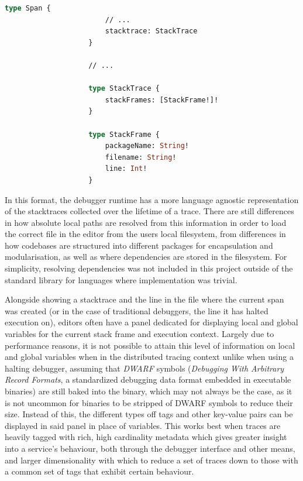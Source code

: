 \documentclass[12pt,pdftex,titlepage]{report}
\begin{document}
                \newpage
                \begin{lstlisting}[caption={GraphQL schema updated with stack- trace and frame objects, unchanged fields and objects filtered.}, language=GraphQL, gobble=20, label={lst:stack}]
                    type Span {
                        // ...
                        stacktrace: StackTrace
                    }

                    // ...

                    type StackTrace {
                        stackFrames: [StackFrame!]!
                    }

                    type StackFrame {
                        packageName: String!
                        filename: String!
                        line: Int!
                    }
                \end{lstlisting}

                In this format, the debugger runtime has a more language agnostic representation of the stacktraces collected over the lifetime of a trace. There are still differences
                in how absolute local paths are resolved from this information in order to load the correct file in the editor from the users local filesystem, from differences in how
                codebases are structured into different packages for encapsulation and modularisation, as well as where dependencies are stored in the filesystem. For simplicity, 
                resolving dependencies was not included in this project outside of the standard library for languages where implementation was trivial.

                Alongside showing a stacktrace and the line in the file where the current span was created (or in the case of traditional debuggers, the line it has halted execution on),
                editors often have a panel dedicated for displaying local and global variables for the current stack frame and execution context. Largely due to performance reasons, it is
                not possible to attain this level of information on local and global variables when in the distributed tracing context unlike when using a halting debugger, assuming that 
                \textit{DWARF} symbols (\textit{Debugging With Arbitrary Record Formats}, a standardized debugging data format embedded in executable binaries)\cite{dwarf} are still baked 
                into the binary, which may not always be the case, as it is not uncommon for binaries to be stripped of DWARF symbols to reduce their size. Instead of this, the different types off
                tags and other key-value pairs can be displayed in said panel in place of variables. This works best when traces are heavily tagged with rich, high cardinality metadata which gives 
                greater insight into a service's behaviour, both through the debugger interface and other means, and larger dimensionality with which to reduce a set of traces down to those with 
                a common set of tags that exhibit certain behaviour.
\end{document}
